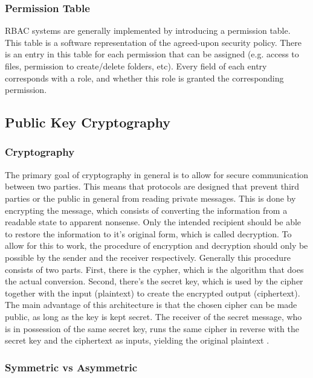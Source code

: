 \subsubsection{Permission Table}
\label{subsec:permissions_table}

RBAC systems are generally implemented by introducing a permission table. This table is a software representation of the agreed-upon security policy. There is an entry in this table for each permission that can be assigned (e.g. access to files, permission to create/delete folders, etc). Every field of each entry corresponds with a role, and whether this role is granted the corresponding permission. 

\subsection{Public Key Cryptography}
\label{sec:PKC}

\subsubsection{Cryptography} 
\label{subsec:cryptography}

The primary goal of cryptography in general is to allow for secure communication between two parties. This means that protocols are designed that prevent third parties or the public in general from reading private messages. This is done by encrypting the message, which consists of converting the information from a readable state to apparent nonsense. Only the intended recipient should be able to restore the information to it's original form, which is called decryption. To allow for this to work, the procedure of encryption and decryption should only be possible by the sender and the receiver respectively. Generally this procedure consists of two parts. First, there is the cypher, which is the algorithm that does the actual conversion. Second, there's the secret key, which is used by the cipher together with the input (plaintext) to create the encrypted output (ciphertext). The main advantage of this architecture is that the chosen cipher can be made public, as long as the key is kept secret. The receiver of the secret message, who is in possession of the same secret key, runs the same cipher in reverse with the secret key and the ciphertext as inputs, yielding the original plaintext \cite{wiki:Cryptography}.

\subsubsection{Symmetric vs Asymmetric}
\label{subsec:symmetric_vs_assymetric}


